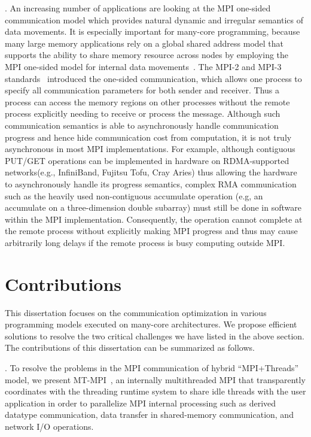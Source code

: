 .
An increasing number of applications are looking at the MPI one-sided
communication model which provides natural dynamic and irregular semantics
of data movements. It is especially important for many-core programming,
because many large memory applications rely on a global shared address
model that supports the ability to share memory resource across nodes
by employing the MPI one-sided model for internal data movements~\cite{dinan12:armci_mpi}.
The MPI-2 and MPI-3 standards~\cite{mpi30-report} introduced the one-sided
communication, which allows one process to specify all communication
parameters for both sender and receiver. Thus a process can access the
memory regions on other processes without the remote process explicitly
needing to receive or process the message. Although such communication
semantics is able to asynchronously handle communication progress and
hence hide communication cost from computation, it is not truly asynchronous
in most MPI implementations. For example, although contiguous PUT/GET
operations can be implemented in hardware on RDMA-supported networks(e.g.,
InfiniBand, Fujitsu Tofu, Cray Aries) thus allowing the hardware to
asynchronously handle its progress semantics, complex RMA communication
such as the heavily used non-contiguous accumulate operation (e.g,
an accumulate on a three-dimension double subarray) must still be done
in software within the MPI implementation. Consequently, the operation
cannot complete at the remote process without explicitly making MPI
progress and thus may cause arbitrarily long delays if the remote process
is busy computing outside MPI.





\section{Contributions}

This dissertation focuses on the communication optimization in
various programming models executed on many-core architectures. We
propose efficient solutions to resolve the two critical challenges we
have listed in the above section. The contributions of this dissertation
can be summarized as follows.

.
To resolve the problems in the MPI communication of hybrid ``MPI+Threads''
model, we present MT-MPI~\cite{mtmpi}, an internally multithreaded MPI that
transparently coordinates with the threading runtime system to share idle
threads with the user application in order to parallelize MPI internal
processing such as derived datatype communication, data transfer in
shared-memory communication, and network I/O operations.

